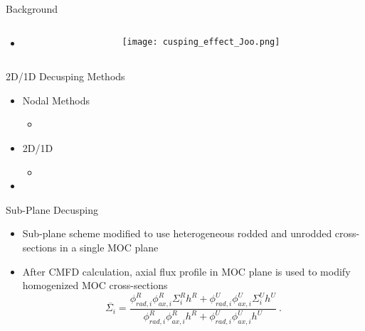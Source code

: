 \begin{frame}[t]{Background}

\begin{columns}
\begin{column}{0.6\textwidth}
    \begin{itemize}
        \item 
    \end{itemize}
\end{column}
\begin{column}{0.4\textwidth}
\begin{figure}[h]
  \centering
  \texttt{[image: cusping\_effect\_Joo.png]}
\end{figure} 
\end{column}
\end{columns}
    
\end{frame}


\begin{frame}[t]{2D/1D Decusping Methods}
    
    \begin{itemize}
        \item Nodal Methods
        \begin{itemize}
            \item 
        \end{itemize}
        \item 2D/1D
        \begin{itemize}
            \item 
        \end{itemize}
        \item
    \end{itemize}
    
\end{frame}


\begin{frame}[t]{Sub-Plane Decusping}
    
\begin{itemize}
    \item Sub-plane scheme modified to use heterogeneous rodded and unrodded cross-sections in a single MOC plane
    \item After CMFD calculation, axial flux profile in MOC plane is used to modify homogenized MOC cross-sections
    \begin{equation}\label{e:nTRACERdecusping}
    \overline{\Sigma_i} = \frac{\phi_{rad,i}^R \phi_{ax,i}^R \Sigma_i^R h^R + \phi_{rad,i}^U \phi_{ax,i}^U \Sigma_i^U h^U}{\phi_{rad,i}^R \phi_{ax,i}^R h^R + \phi_{rad,i}^U \phi_{ax,i}^U h^U}\ .
    \end{equation}
\end{itemize}
    
\end{frame}

